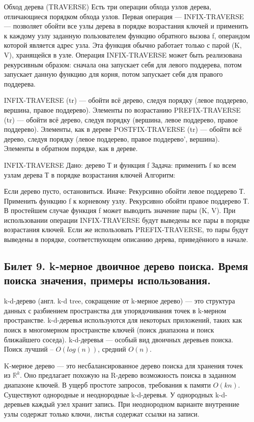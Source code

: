 \documentclass[a4paper, 12pt]{article}
\begin{document}
	Обход дерева (TRAVERSE)
	Есть три операции обхода узлов дерева, отличающиеся порядком обхода узлов.
	Первая операция — INFIX-TRAVERSE — позволяет обойти все узлы дерева в порядке возрастания ключей и применить к каждому узлу заданную пользователем функцию обратного вызова f, операндом которой является адрес узла. Эта функция обычно работает только с парой (K, V), хранящейся в узле. Операция INFIX-TRAVERSE может быть реализована рекурсивным образом: сначала она запускает себя для левого поддерева, потом запускает данную функцию для корня, потом запускает себя для правого поддерева.
	
	INFIX-TRAVERSE (tr) — обойти всё дерево, следуя порядку (левое поддерево, вершина, правое поддерево). Элементы по возрастанию
	PREFIX-TRAVERSE (tr) — обойти всё дерево, следуя порядку (вершина, левое поддерево, правое поддерево). Элементы, как в дереве
	POSTFIX-TRAVERSE (tr) — обойти всё дерево, следуя порядку (левое поддерево, правое поддерево', вершина). Элементы в обратном порядке, как в дереве.
	
	INFIX-TRAVERSE
	Дано: дерево Т и функция f
	Задача: применить f ко всем узлам дерева Т в порядке возрастания ключей
	Алгоритм:
	
	Если дерево пусто, остановиться.
	Иначе:
	Рекурсивно обойти левое поддерево Т.
	Применить функцию f к корневому узлу.
	Рекурсивно обойти правое поддерево Т.
	В простейшем случае функция f может выводить значение пары (K, V). При использовании операции INFIX-TRAVERSE будут выведены все пары в порядке возрастания ключей. Если же использовать PREFIX-TRAVERSE, то пары будут выведены в порядке, соответствующем описанию дерева, приведённого в начале.
	
	\subsection*{Билет 9.  k-мерное двоичное дерево поиска. Время поиска значения, примеры использования.}
	k-d-дерево (англ. k-d tree, сокращение от k-мерное дерево) — это структура данных с разбиением пространства для упорядочивания точек в k-мерном пространстве. k-d-деревья используются для некоторых приложений, таких как поиск в многомерном пространстве ключей (поиск диапазона и поиск ближайшего соседа). k-d-деревья — особый вид двоичных деревьев поиска.
	Поиск лучший --	$O(log (n))$, средний $O(n)$.
	
	K-мерное дерево — это несбалансированное дерево поиска для хранения точек из $\mathbb {R}^{k}$. Оно предлагает похожую на R-дерево возможность поиска в заданном диапазоне ключей. В ущерб простоте запросов, требования к памяти $O(kn)$. Существуют однородные и неоднородные k-d-деревья. У однородных k-d-деревьев каждый узел хранит запись. При неоднородном варианте внутренние узлы содержат только ключи, листья содержат ссылки на записи.
	
\end{document}
